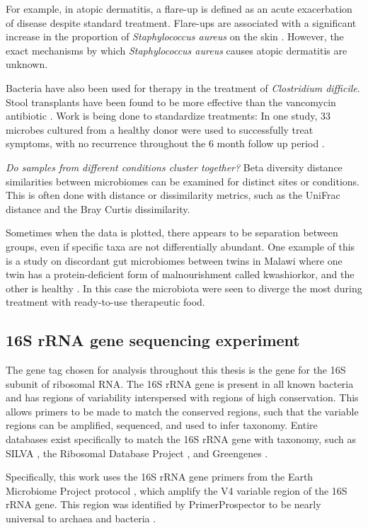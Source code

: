 For example, in atopic dermatitis, a flare-up is defined as an acute exacerbation of disease despite standard treatment. Flare-ups are associated with a significant increase in the proportion of \textit{Staphylococcus aureus} on the skin \cite{kong2012temporal}. However, the exact mechanisms by which \textit{Staphylococcus aureus} causes atopic dermatitis are unknown.

Bacteria have also been used for therapy in the treatment of \textit{Clostridium difficile}. Stool transplants have been found to be more effective than the vancomycin antibiotic \cite{van2013duodenal}. Work is being done to standardize treatments: In one study, 33 microbes cultured from a healthy donor were used to successfully treat symptoms, with no recurrence throughout the 6 month follow up period \cite{petrof2013stool}.

\textit{Do samples from different conditions cluster together?}
Beta diversity distance similarities between microbiomes can be examined for distinct sites or conditions. This is often done with distance or dissimilarity metrics, such as the UniFrac distance and the Bray Curtis dissimilarity.

Sometimes when the data is plotted, there appears to be separation between groups, even if specific taxa are not differentially abundant. One example of this is a study on discordant gut microbiomes between twins in Malawi where one twin has a protein-deficient form of malnourishment called kwashiorkor, and the other is healthy \cite{smith2013gut}. In this case the microbiota were seen to diverge the most during treatment with ready-to-use therapeutic food.

\subsection{16S rRNA gene sequencing experiment}
The gene tag chosen for analysis throughout this thesis is the gene for the 16S subunit of ribosomal RNA. The 16S rRNA gene is present in all known bacteria and has regions of variability interspersed with regions of high conservation. This allows primers to be made to match the conserved regions, such that the variable regions can be amplified, sequenced, and used to infer taxonomy. Entire databases exist specifically to match the 16S rRNA gene with taxonomy, such as SILVA \cite{quast2013silva}, the Ribosomal Database Project \cite{cole2009ribosomal}, and Greengenes \cite{desantis2006greengenes}.

Specifically, this work uses the 16S rRNA gene primers from the Earth Microbiome Project protocol \cite{gilbert2014earth}, which amplify the V4 variable region of the 16S rRNA gene. This region was identified by PrimerProspector to be nearly universal to archaea and bacteria \cite{walters2011primerprospector}.

